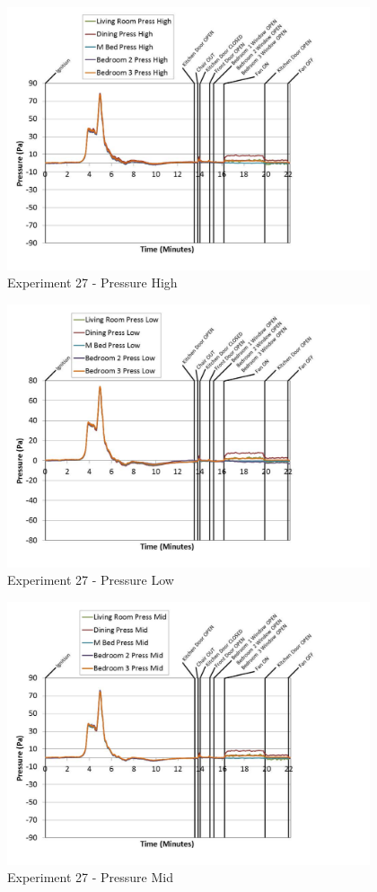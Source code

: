 \documentclass{article}
\begin{document}
\begin{appendices}
	\begin{figure}[h!]
		\centering
		\includegraphics[height=3.05in]{0_Images/Results_Charts/Exp_27_Charts/PressureHigh.pdf}
		\caption{Experiment 27 - Pressure High}
	\end{figure}
 
	\clearpage

	\begin{figure}[h!]
		\centering
		\includegraphics[height=3.05in]{0_Images/Results_Charts/Exp_27_Charts/PressureLow.pdf}
		\caption{Experiment 27 - Pressure Low}
	\end{figure}
 

	\begin{figure}[h!]
		\centering
		\includegraphics[height=3.05in]{0_Images/Results_Charts/Exp_27_Charts/PressureMid.pdf}
		\caption{Experiment 27 - Pressure Mid}
	\end{figure}
 
	\clearpage

		\clearpage
\end{appendices}
\end{document}
